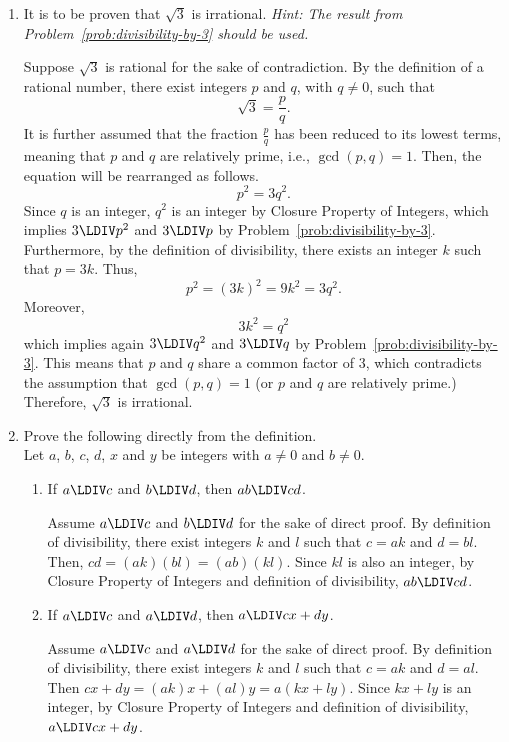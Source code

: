 \begin{enumerate}
  \item It is to be proven that $\sqrt{3}$ is irrational.
  \label{prob:sqrt3-irrational} %
  \textit{Hint: The result from Problem~\ref{prob:divisibility-by-3} should be used.}
  \begin{subprove}
    Suppose $\sqrt{3}$ is rational for the sake of contradiction. By the definition of 
    a rational number, there exist integers $p$ and $q$, with $q \neq 0$, such that 
    $$\sqrt{3} = \frac{p}{q}.$$ 
    It is further assumed that the fraction $\frac{p}{q}$ has 
    been reduced to its lowest terms, meaning that $p$ and $q$ are relatively prime, 
    i.e., $\gcd(p,q) = 1$. Then, the equation will be rearranged as follows.
    $$p^2 = 3q^2.$$
    Since $q$ is an integer, $q^2$ is an integer by Closure Property of 
    Integers, which implies $3\LDIV p^2$ and $3\LDIV p$ by Problem~\ref{prob:divisibility-by-3}.
    Furthermore, by the definition of divisibility, there exists an integer $k$ such that $p = 3k$. 
    Thus,
    $$
    p^2 =(3k)^2 = 9k^2 = 3q^2.
    $$
    Moreover,
    $$
    3k^2 = q^2
    $$
    which implies again $3\LDIV q^2$ and $3\LDIV q$ by Problem~\ref{prob:divisibility-by-3}.
    This means that $p$ and $q$ share a common factor of $3$, which contradicts the assumption 
    that $\gcd(p,q) = 1$ (or $p$ and $q$ are relatively prime.) 
    Therefore, $\sqrt{3}$ is irrational.
  \end{subprove}
  \newpage


  \item Prove the following directly from the definition.   \\
  Let $a$, $b$, $c$, $d$, $x$ and $y$ be integers with $a \neq 0$ and $b \neq 0$.
  \begin{enumerate}
    \item If $a\LDIV c$ and $b\LDIV d$, then $ab\LDIV cd$.
    \begin{subprove}
      Assume $a\LDIV c$ and $b\LDIV d$ for the sake of direct proof.
      By definition of divisibility, there exist integers $k$ and $l$ such that $c = ak$ and $d = bl$.
      Then, $cd = (ak)(bl) = (ab)(kl)$. Since $kl$ is also an integer, by Closure Property 
      of Integers and definition of divisibility, $ab\LDIV cd$.
    \end{subprove}
    
    \item If $a\LDIV c$ and $a\LDIV d$, then $a\LDIV cx + dy$.
    \begin{subprove}
      Assume $a\LDIV c$ and $a\LDIV d$ for the sake of direct proof.
      By definition of divisibility, there exist integers $k$ and $l$ such that $c = ak$ and $d = al$.
      Then $cx + dy = (ak)x + (al)y = a(kx + ly)$.
      Since $kx + ly$ is an integer, by Closure Property 
      of Integers and definition of divisibility, $a\LDIV cx + dy$.
    \end{subprove}
    

\end{enumerate}
\end{enumerate}
